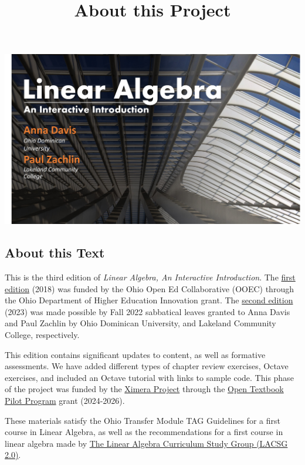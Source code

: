 \documentclass{ximera}
\title{About this Project} \license{CC BY-NC-SA 4.0}
\begin{document}
\begin{abstract}
\end{abstract}
\maketitle

\begin{image}
\includegraphics{BookCover1.jpg}
\end{image}

\subsection{About this Text}
This is the third edition of \emph{Linear Algebra, An Interactive Introduction}.  The \href{https://ximera.osu.edu/la/LinearAlgebra}{first edition} (2018) was funded by the Ohio Open Ed Collaborative (OOEC) through the Ohio Department of Higher Education Innovation grant. The \href{https://ximera.osu.edu/oerlinalg}{second edition} (2023) was made possible by Fall 2022 sabbatical leaves granted to Anna Davis and Paul Zachlin by Ohio Dominican University, and Lakeland Community College, respectively.

This edition contains significant updates to content, as well as formative assessments.  We have added different types of chapter review exercises, Octave exercises, and included an Octave tutorial with links to sample code.  This phase of the project was funded by the \href{https://github.com/XimeraProject}{Ximera Project} through the \href{https://www2.ed.gov/programs/otp/index.html}{Open Textbook Pilot Program} grant (2024-2026).

These materials satisfy the Ohio Transfer Module TAG Guidelines for a first course in Linear Algebra, as well as the recommendations for a first course in linear algebra made by \href{https://dx.doi.org/10.1090/noti2479}{The Linear Algebra Curriculum Study Group (LACSG 2.0)}.  
\end{document}
